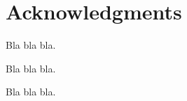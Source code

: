 \section*{Acknowledgments}
\label{sec::acknowlegments}

Bla bla bla.

\vspace{0.2cm}

Bla bla bla.

\vspace{0.2cm}

Bla bla bla.
